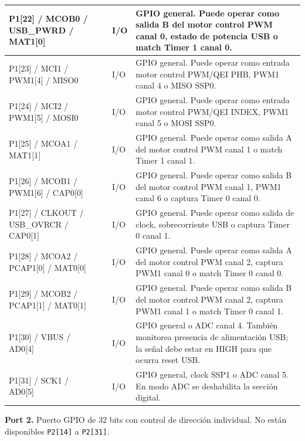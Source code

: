 ﻿\documentclass[11pt]{article}
\begin{document}
\begin{longtable}{|>{\raggedright\arraybackslash}p{}|>{\raggedright\arraybackslash}p{}|>{\raggedright\arraybackslash}p{}|>{\raggedright\arraybackslash}p{}|}
\hline
P1[22] / MCOB0 / USB\_PWRD / MAT1[0] & 36 & I/O & GPIO general. Puede operar como salida B del motor control PWM canal 0, estado de potencia USB o match Timer 1 canal 0. \\
\hline
P1[23] / MCI1 / PWM1[4] / MISO0 & 37 & I/O & GPIO general. Puede operar como entrada motor control PWM/QEI PHB, PWM1 canal 4 o MISO SSP0. \\
\hline
P1[24] / MCI2 / PWM1[5] / MOSI0 & 38 & I/O & GPIO general. Puede operar como entrada motor control PWM/QEI INDEX, PWM1 canal 5 o MOSI SSP0. \\
\hline
P1[25] / MCOA1 / MAT1[1] & 39 & I/O & GPIO general. Puede operar como salida A del motor control PWM canal 1 o match Timer 1 canal 1. \\
\hline
P1[26] / MCOB1 / PWM1[6] / CAP0[0] & 40 & I/O & GPIO general. Puede operar como salida B del motor control PWM canal 1, PWM1 canal 6 o captura Timer 0 canal 0. \\
\hline
P1[27] / CLKOUT / USB\_OVRCR / CAP0[1] & 43 & I/O & GPIO general. Puede operar como salida de clock, sobrecorriente USB o captura Timer 0 canal 1. \\
\hline
P1[28] / MCOA2 / PCAP1[0] / MAT0[0] & 44 & I/O & GPIO general. Puede operar como salida A del motor control PWM canal 2, captura PWM1 canal 0 o match Timer 0 canal 0. \\
\hline
P1[29] / MCOB2 / PCAP1[1] / MAT0[1] & 45 & I/O & GPIO general. Puede operar como salida B del motor control PWM canal 2, captura PWM1 canal 1 o match Timer 0 canal 1. \\
\hline
P1[30] / VBUS / AD0[4] & 21 & I/O & GPIO general o ADC canal 4. También monitorea presencia de alimentación USB; la señal debe estar en HIGH para que ocurra reset USB. \\
\hline
P1[31] / SCK1 / AD0[5] & 20 & I/O & GPIO general, clock SSP1 o ADC canal 5. En modo ADC se deshabilita la sección digital. \\
\hline
\end{longtable}

\noindent\textbf{Port 2.} Puerto GPIO de 32 bits con control de dirección individual. No están disponibles \texttt{P2[14]} a \texttt{P2[31]}.
\end{document}
